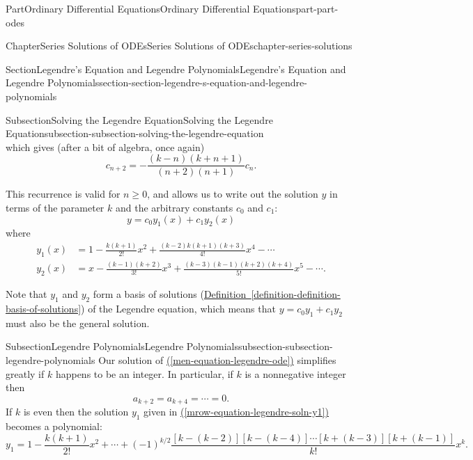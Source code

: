 \documentclass[twoside,10pt,]{book}
\newcommand{\xreffont}{\relax}
\numberwithin{equation}{part}
\begin{document}
\begin{partptx}{Part}{Ordinary Differential Equations}{}{Ordinary Differential Equations}{}{}{part-part-odes}
\begin{chapterptx}{Chapter}{Series Solutions of ODEs}{}{Series Solutions of ODEs}{}{}{chapter-series-solutions}
\begin{sectionptx}{Section}{Legendre's Equation and Legendre Polynomials}{}{Legendre's Equation and Legendre Polynomials}{}{}{section-section-legendre-s-equation-and-legendre-polynomials}
\begin{subsectionptx}{Subsection}{Solving the Legendre Equation}{}{Solving the Legendre Equation}{}{}{subsection-subsection-solving-the-legendre-equation}
\begin{equation*}
\end{equation*}
which gives (after a bit of algebra, once again)%
\begin{equation*}
c_{n+2} = -\frac{(k - n)(k + n + 1)}{(n + 2)(n + 1)}c_{n}\text{.}
\end{equation*}
%
\par
This recurrence is valid for \(n \geq 0\), and allows us to write out the solution \(y\) in terms of the parameter \(k\) and the arbitrary constants \(c_{0}\) and \(c_{1}\):%
\begin{equation*}
y = c_{0}y_{1}(x) + c_{1}y_{2}(x)
\end{equation*}
where%
\begin{align}
y_{1}(x) & = 1 - \frac{k(k+1)}{2!}x^{2} + \frac{(k - 2)k(k+1)(k + 3)}{4!}x^{4} - \cdots\label{mrow-equation-legendre-soln-y1}\\
y_{2}(x) & = x - \frac{(k-1)(k+2)}{3!}x^{3} + \frac{(k-3)(k-1)(k+2)(k+4)}{5!}x^{5} - \cdots \text{.}\label{mrow-equation-legendre-soln-y2}
\end{align}
%
\par
Note that \(y_{1}\) and \(y_{2}\) form a basis of solutions (\hyperref[definition-definition-basis-of-solutions]{Definition~{\xreffont\ref{definition-definition-basis-of-solutions}}}) of the Legendre equation, which means that \(y = c_{0}y_{1} + c_{1}y_{2}\) must also be the general solution.%
\end{subsectionptx}
%
%
\typeout{************************************************}
\typeout{************************************************}
%
\begin{subsectionptx}{Subsection}{Legendre Polynomials}{}{Legendre Polynomials}{}{}{subsection-subsection-legendre-polynomials}
Our solution of \hyperref[men-equation-legendre-ode]{({\xreffont\ref{men-equation-legendre-ode}})} simplifies greatly if \(k\) happens to be an integer. In particular, if \(k\) is a nonnegative integer then%
\begin{equation*}
a_{k+2} = a_{k+4} = \cdots = 0\text{.}
\end{equation*}
If \(k\) is even then the solution \(y_{1}\) given in \hyperref[mrow-equation-legendre-soln-y1]{({\xreffont\ref{mrow-equation-legendre-soln-y1}})} becomes a polynomial:%
\begin{equation*}
y_{1} = 1 - \frac{k(k+1)}{2!}x^{2} + \cdots + (-1)^{k/2}\frac{[k - (k-2)][k - (k-4)]\cdots[k + (k-3)][k + (k-1)]}{k!}x^{k}\text{.}
\end{equation*}

\end{subsectionptx}
\end{sectionptx}
\end{chapterptx}
\end{partptx}
\end{document}
